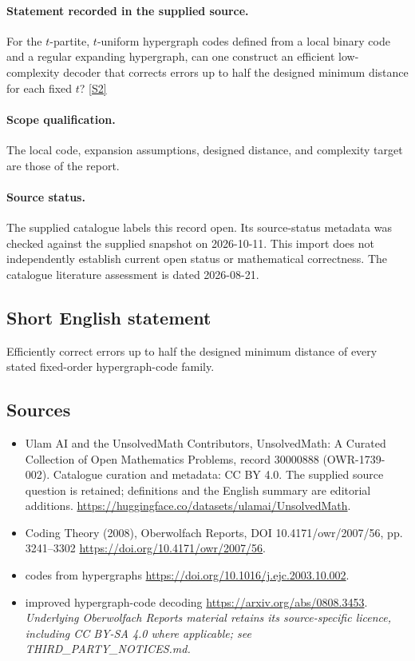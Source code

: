 \documentclass[11pt]{article}
\begin{document}
\paragraph{Statement recorded in the supplied source.}
For the $t$-partite, $t$-uniform hypergraph codes defined from a local binary code and a regular expanding hypergraph, can one construct an efficient low-complexity decoder that corrects errors up to half the designed minimum distance for each fixed $t$? \href{https://doi.org/10.4171/owr/2007/56}{[S2]}
\paragraph{Scope qualification.}
The local code, expansion assumptions, designed distance, and complexity target are those of the report.
\paragraph{Source status.}
The supplied catalogue labels this record open. Its source-status metadata was checked against the supplied snapshot on 2026-10-11. This import does not independently establish current open status or mathematical correctness. The catalogue literature assessment is dated 2026-08-21.
\subsection{Short English statement}
Efficiently correct errors up to half the designed minimum distance of every stated fixed-order hypergraph-code family.
\subsection{Sources}
\begin{itemize}
\item[S1] Ulam AI and the UnsolvedMath Contributors, UnsolvedMath: A Curated Collection of Open Mathematics Problems, record 30000888 (OWR-1739-002). Catalogue curation and metadata: CC BY 4.0. The supplied source question is retained; definitions and the English summary are editorial additions.
\url{https://huggingface.co/datasets/ulamai/UnsolvedMath}.
\item[S2] Coding Theory (2008), Oberwolfach Reports, DOI 10.4171/owr/2007/56, pp. 3241--3302
\url{https://doi.org/10.4171/owr/2007/56}.
\item[S3] codes from hypergraphs
\url{https://doi.org/10.1016/j.ejc.2003.10.002}.
\item[S4] improved hypergraph-code decoding
\url{https://arxiv.org/abs/0808.3453}.
\textit{Underlying Oberwolfach Reports material retains its source-specific licence, including CC BY-SA 4.0 where applicable; see THIRD\_PARTY\_NOTICES.md.}
\end{itemize}
\end{document}
